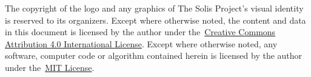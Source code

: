 The copyright of the logo and any graphics of The Solis Project's visual identity is reserved to its organizers.
Except where otherwise noted, the content and data in this document is licensed by the author under the~\href{http://creativecommons.org/licenses/by/4.0/}{Creative Commons Attribution 4.0 International License}.
Except where otherwise noted, any software, computer code or algorithm contained herein is licensed by the author under the~\href{https://opensource.org/license/mit/}{MIT License}.\\
\par\textcolor{foreground}{\hfill\ccby}
